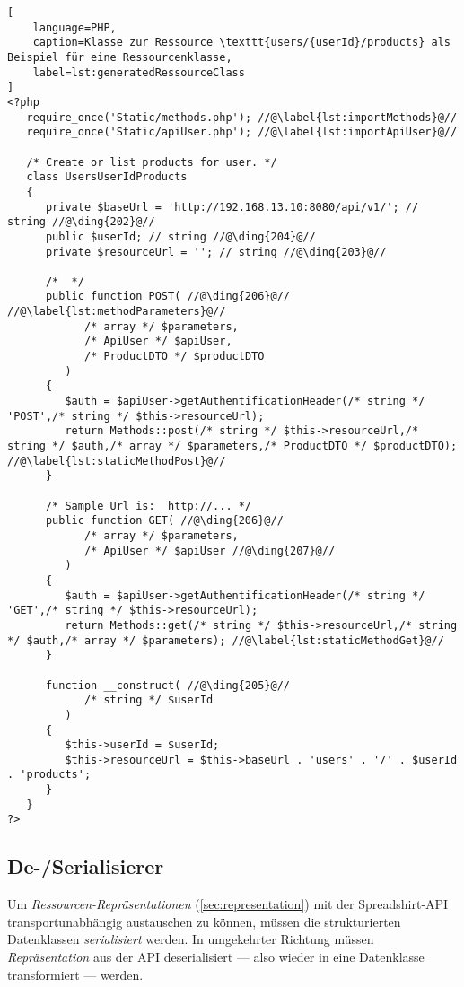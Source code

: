 \begin{minipage}{\textwidth}
\begin{lstlisting}[
    language=PHP,
    caption=Klasse zur Ressource \texttt{users/{userId}/products} als Beispiel für eine Ressourcenklasse,
    label=lst:generatedRessourceClass
]
<?php
   require_once('Static/methods.php'); //@\label{lst:importMethods}@//
   require_once('Static/apiUser.php'); //@\label{lst:importApiUser}@//

   /* Create or list products for user. */
   class UsersUserIdProducts
   {
      private $baseUrl = 'http://192.168.13.10:8080/api/v1/'; // string //@\ding{202}@//
      public $userId; // string //@\ding{204}@//
      private $resourceUrl = ''; // string //@\ding{203}@//

      /*  */
      public function POST( //@\ding{206}@// //@\label{lst:methodParameters}@//
            /* array */ $parameters, 
            /* ApiUser */ $apiUser,
            /* ProductDTO */ $productDTO
         )
      {
         $auth = $apiUser->getAuthentificationHeader(/* string */ 'POST',/* string */ $this->resourceUrl);
         return Methods::post(/* string */ $this->resourceUrl,/* string */ $auth,/* array */ $parameters,/* ProductDTO */ $productDTO); //@\label{lst:staticMethodPost}@//
      }

      /* Sample Url is:  http://... */
      public function GET( //@\ding{206}@//
            /* array */ $parameters,
            /* ApiUser */ $apiUser //@\ding{207}@//
         )
      {
         $auth = $apiUser->getAuthentificationHeader(/* string */ 'GET',/* string */ $this->resourceUrl);
         return Methods::get(/* string */ $this->resourceUrl,/* string */ $auth,/* array */ $parameters); //@\label{lst:staticMethodGet}@//
      }

      function __construct( //@\ding{205}@//
            /* string */ $userId
         )
      {
         $this->userId = $userId;
         $this->resourceUrl = $this->baseUrl . 'users' . '/' . $userId . 'products';
      }
   }
?>
\end{lstlisting}
\end{minipage}

\subsection{De-/Serialisierer}
\label{sec:serialiser}

Um \emph{Ressourcen-Repräsentationen} (\cref{sec:representation}) mit der Spreadshirt-\gls{API} transportunabhängig austauschen zu können, müssen die strukturierten Datenklassen \emph{serialisiert} werden. In umgekehrter Richtung müssen \emph{Repräsentation} aus der \gls{API} deserialisiert --- also wieder in eine Datenklasse transformiert --- werden.

